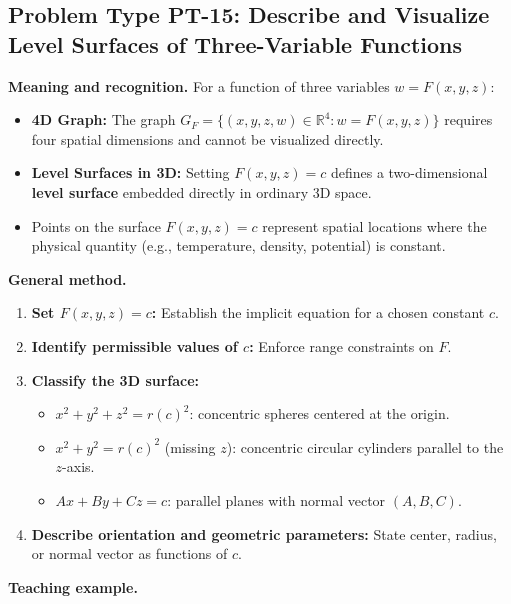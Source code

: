 \documentclass[11pt,letterpaper]{article}
\newcommand{\R}{\mathbb{R}}
\begin{document}
\subsection{Problem Type PT-15: Describe and Visualize Level Surfaces of Three-Variable Functions}\label{pt:15}

\textbf{Meaning and recognition.} 
For a function of three variables $w = F(x,y,z)$:
\begin{itemize}[leftmargin=*]
    \item \textbf{4D Graph:} The graph $G_F = \{(x,y,z,w) \in \R^4 : w = F(x,y,z)\}$ requires four spatial dimensions and cannot be visualized directly.
    \item \textbf{Level Surfaces in 3D:} Setting $F(x,y,z) = c$ defines a two-dimensional \textbf{level surface} embedded directly in ordinary 3D space.
    \item Points on the surface $F(x,y,z)=c$ represent spatial locations where the physical quantity (e.g., temperature, density, potential) is constant.
\end{itemize}

\textbf{General method.}
\begin{enumerate}[leftmargin=*,nosep]
    \item \textbf{Set $F(x,y,z) = c$:} Establish the implicit equation for a chosen constant $c$.
    \item \textbf{Identify permissible values of $c$:} Enforce range constraints on $F$.
    \item \textbf{Classify the 3D surface:}
    \begin{itemize}[nosep]
        \item $x^2 + y^2 + z^2 = r(c)^2$: concentric spheres centered at the origin.
        \item $x^2 + y^2 = r(c)^2$ (missing $z$): concentric circular cylinders parallel to the $z$-axis.
        \item $Ax + By + Cz = c$: parallel planes with normal vector $(A,B,C)$.
    \end{itemize}
    \item \textbf{Describe orientation and geometric parameters:} State center, radius, or normal vector as functions of $c$.
\end{enumerate}

\textbf{Teaching example.}
\end{document}
